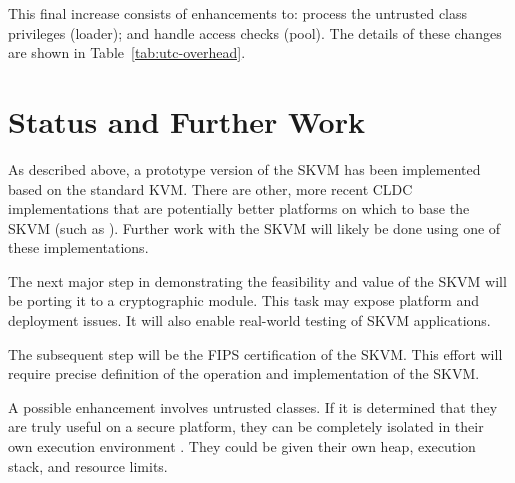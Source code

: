 \documentclass{llncs}
\begin{document}
This final increase consists of enhancements to: process the untrusted
class privileges (loader); and handle access checks (pool). The details
of these changes are shown in Table~\ref{tab:utc-overhead}.

\section{Status and Further Work}

As described above, a prototype version of the SKVM has been implemented
based on the standard KVM. There are other, more recent CLDC
implementations that are potentially better platforms on which to base
the SKVM (such as \cite{shaylor}). Further work with the SKVM will likely be done
using one of these implementations.

The next major step in demonstrating the feasibility and value of the
SKVM will be porting it to a cryptographic module. This task may expose
platform and deployment issues. It will also enable real-world testing
of SKVM applications.

The subsequent step will be the FIPS certification of the SKVM. This
effort will require precise definition of the operation and
implementation of the SKVM.

A possible enhancement involves untrusted classes. If it is determined
that they are truly useful on a secure platform, they can be completely
isolated in their own execution environment \cite{doorn}. They could be given
their own heap, execution stack, and resource limits.
\end{document}
